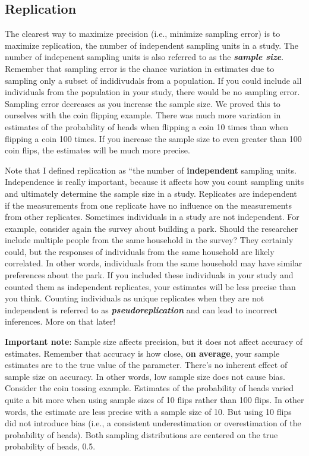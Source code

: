 \documentclass[
]{book}
\begin{document}
\subsection{Replication}\label{replication}

The clearest way to maximize precision (i.e., minimize sampling error) is to maximize replication, the number of independent sampling units in a study. The number of indepenent sampling units is also referred to as the \textbf{\emph{sample size}}. Remember that sampling error is the chance variation in estimates due to sampling only a subset of indidivudals from a population. If you could include all individuals from the population in your study, there would be no sampling error. Sampling error decreases as you increase the sample size. We proved this to ourselves with the coin flipping example. There was much more variation in estimates of the probability of heads when flipping a coin 10 times than when flipping a coin 100 times. If you increase the sample size to even greater than 100 coin flips, the estimates will be much more precise.

Note that I defined replication as ``the number of \textbf{independent} sampling units. Independence is really important, because it affects how you count sampling units and ultimately determine the sample size in a study. Replicates are independent if the measurements from one replicate have no influence on the measurements from other replicates. Sometimes individuals in a study are not independent. For example, consider again the survey about building a park. Should the researcher include multiple people from the same household in the survey? They certainly could, but the responses of individuals from the same household are likely correlated. In other words, individuals from the same household may have similar preferences about the park. If you included these individuals in your study and counted them as independent replicates, your estimates will be less precise than you think. Counting individuals as unique replicates when they are not independent is referred to as \textbf{\emph{pseudoreplication}} and can lead to incorrect inferences. More on that later!

\textbf{Important note}: Sample size affects precision, but it does not affect accuracy of estimates. Remember that accuracy is how close, \textbf{on average}, your sample estimates are to the true value of the parameter. There's no inherent effect of sample size on accuracy. In other words, low sample size does not cause bias. Consider the coin tossing example. Estimates of the probability of heads varied quite a bit more when using sample sizes of 10 flips rather than 100 flips. In other words, the estimate are less precise with a sample size of 10. But using 10 flips did not introduce bias (i.e., a consistent underestimation or overestimation of the probability of heads). Both sampling distributions are centered on the true probability of heads, 0.5.
\end{document}
